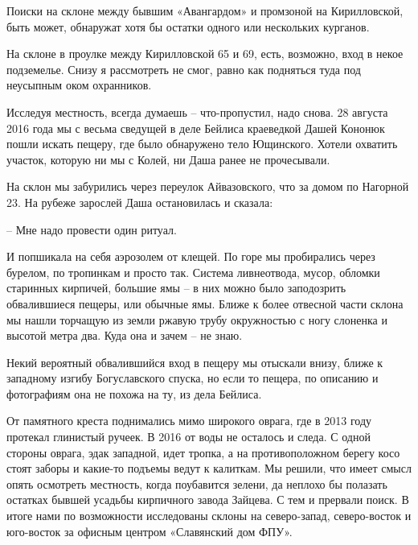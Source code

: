 Поиски на склоне между бывшим «Авангардом» и промзоной на Кирилловской, быть может, обнаружат хотя бы остатки одного или нескольких курганов. %

На склоне в проулке между Кирилловской 65 и 69, есть, возможно, вход в некое подземелье. Снизу я рассмотреть не смог, равно как подняться туда под неусыпным оком охранников.

Исследуя местность, всегда думаешь – что-пропустил, надо снова. 28 августа 2016 года мы с весьма сведущей в деле Бейлиса краеведкой Дашей Кононюк пошли искать пещеру, где было обнаружено тело Ющинского. Хотели охватить участок, которую ни мы с Колей, ни Даша ранее не прочесывали.

На склон мы забурились через переулок Айвазовского, что за домом по Нагорной 23. На рубеже зарослей Даша остановилась и сказала:

 – Мне надо провести один ритуал.

И попшикала на себя аэрозолем от клещей. По горе мы пробирались через бурелом, по тропинкам и просто так. Система ливнеотвода, мусор, обломки старинных кирпичей, большие ямы – в них можно было заподозрить обвалившиеся пещеры, или обычные ямы. Ближе к более отвесной части склона мы нашли торчащую из земли ржавую трубу окружностью с ногу слоненка и высотой метра два. Куда она и зачем – не знаю.

Некий вероятный обвалившийся вход в пещеру мы отыскали внизу, ближе к западному изгибу Богуславского спуска, но если то пещера, по описанию и фотографиям она не похожа на ту, из дела Бейлиса.

От памятного креста поднимались мимо широкого оврага, где в 2013 году протекал глинистый ручеек. В 2016 от воды не осталось и следа. С одной стороны оврага, эдак западной, идет тропка, а на противоположном берегу косо стоят заборы и какие-то подъемы ведут к калиткам. Мы решили, что имеет смысл опять осмотреть местность, когда поубавится зелени, да неплохо бы полазать остатках бывшей усадьбы кирпичного завода Зайцева. С тем и прервали поиск. В итоге нами по возможности исследованы склоны на северо-запад, северо-восток и юго-восток за офисным центром «Славянский дом ФПУ».

